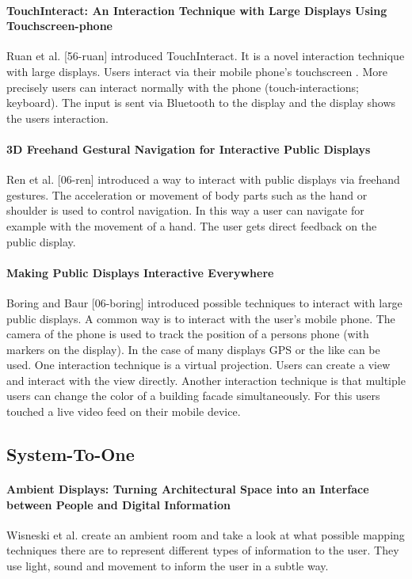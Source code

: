 \paragraph{TouchInteract: An Interaction Technique with Large Displays Using Touchscreen-phone}
Ruan et al. [56-ruan] introduced TouchInteract. It is a novel interaction technique with large displays. Users interact via their mobile phone’s touchscreen . More precisely users can interact normally with the phone (touch-interactions; keyboard). The input is sent via Bluetooth to the display and the display shows the users interaction.

\paragraph{3D Freehand Gestural Navigation for Interactive Public Displays}
Ren et al. [06-ren] introduced a way to interact with public displays via freehand gestures. The acceleration or movement of body parts such as the hand or shoulder is used to control navigation. In this way a user can navigate for example with the movement of a hand. The user gets direct feedback on the public display.

\paragraph{Making Public Displays Interactive Everywhere}
Boring and Baur [06-boring] introduced possible techniques to interact with large public displays. A common way is to interact with the user’s mobile phone. The camera of the phone is used to track the position of a persons phone (with markers on the display). In the case of many displays GPS or the like can be used. One interaction technique is a virtual projection. Users can create a view and interact with the view directly. Another interaction technique is that multiple users can change the color of a building facade simultaneously. For this users touched a live video feed on their mobile device.

\subsection{System-To-One}

\paragraph{Ambient Displays: Turning Architectural Space into an Interface between People and Digital Information}
Wisneski et al. \cite{wisneski_ambient_1998} create an ambient room and take a look at what possible mapping techniques there are to represent different types of information to the user. They use light, sound and movement to inform the user in a subtle way.

